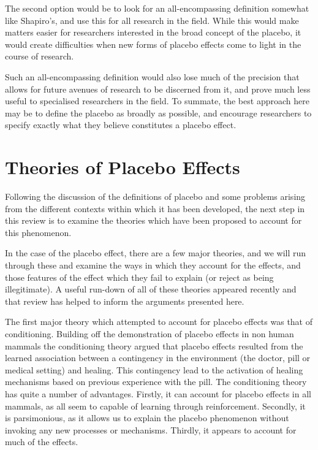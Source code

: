 The second option would be to look for an all-encompassing definition somewhat like Shapiro's, and use this for all research in the field. While this would make matters easier for researchers interested in the broad concept of the placebo, it would create difficulties when new forms of placebo effects come to light in the course of research. 

Such an all-encompassing definition would also lose much of the precision that allows for future avenues of research to be discerned from it, and prove much less useful to specialised researchers in the field. To summate, the best approach here may be to define the placebo as broadly as possible, and encourage researchers to specify exactly what they believe constitutes a placebo effect. 


\section{Theories of Placebo Effects}
\label{sec:theor-plac-effects}
Following the discussion of the definitions of placebo and some problems arising from the different contexts within which it has been developed, the next step in this review is to examine the theories which have been proposed to account for this phenomenon. 

In the case of the placebo effect, there are a few major theories, and we will run through these and examine the ways in which they account for the effects, and those features of the effect which they fail to explain (or reject as being illegitimate). A useful run-down of all of these theories appeared recently \cite{Stewart-Williams2004b} and that review has helped to inform the arguments presented here. 

The first major theory which attempted to account for placebo effects was that of conditioning. Building off the demonstration of placebo effects in non human mammals \cite{Herrnstein1962} the conditioning theory argued that placebo effects resulted from the learned association between a contingency in the environment (the doctor, pill or medical setting) and healing. This contingency lead to the activation of healing mechanisms based on previous experience with the pill. The conditioning theory has quite a number of advantages. Firstly, it can account for placebo effects in all mammals, as all seem to capable of learning through reinforcement. Secondly, it is parsimonious, as it allows us to explain the placebo phenomenon without invoking any new processes or mechanisms. Thirdly, it appears to account for much of the effects. 

